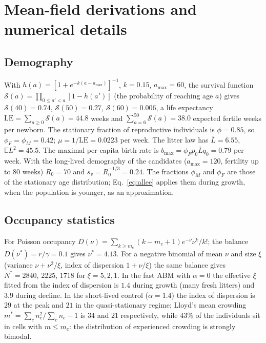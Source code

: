 
\section{Mean-field derivations and numerical details}
\label{app:meanfield}

\subsection{Demography}
\label{app:demo}

With $h(a)=[1+e^{-k(a-a_{\max})}]^{-1}$, $k=0.15$, $a_{\max}=60$, the survival
function $\mathcal S(a)=\prod_{0\le a'<a}[1-h(a')]$ (the probability of reaching age $a$) gives
$\mathcal S(40)=0.74$, $\mathcal S(50)=0.27$, $\mathcal S(60)=0.006$, a life expectancy
$\mathrm{LE}=\sum_{a\ge0}\mathcal S(a)=44.8$ weeks and
$\sum_{a=6}^{50}\mathcal S(a)=38.0$ expected fertile weeks per newborn. The
stationary fraction of reproductive individuals is $\phi=0.85$, so
$\phi_F=\phi_M=0.42$; $\mu=1/\mathrm{LE}=0.0223$ per week. The litter law has
$\bar L=6.55$, $\mathbb E L^2=45.5$. The maximal per-capita birth rate is
$b_{\max}=\phi_F p_0\bar L q_0=0.79$ per week. With the long-lived demography of the candidates ($a_{\max}=120$,
fertility up to 80 weeks) $R_0=70$ and $s_v=R_0^{-1/3}=0.24$. The fractions $\phi_M$ and $\phi_F$ are those of the
stationary age distribution; Eq.~\eqref{eq:allee} applies them during growth, when the population is younger, as an
approximation.

\subsection{Occupancy statistics}
\label{app:occ}

For Poisson occupancy $D(\nu)=\sum_{k\ge m_c}(k-m_c+1)e^{-\nu}\nu^k/k!$;
the balance $D(\nu^*)=r/\gamma=0.1$ gives $\nu^*=4.13$. For a negative
binomial of mean $\nu$ and size $\xi$ (variance $\nu+\nu^2/\xi$,
index of dispersion $1+\nu/\xi$) the same balance gives
$N^*=2840,\,2225,\,1718$ for $\xi=5,2,1$. In the fast ABM with $\alpha=0$
the effective $\xi$ fitted from the index of dispersion is $1.4$ during
growth (many fresh litters) and $3.9$ during decline. In the short-lived control
($\alpha=1.4$) the index of dispersion is $29$ at the peak and $21$ in the
quasi-stationary regime; Lloyd's mean crowding $m^*=\sum_c n_c^2/\sum_c n_c-1$
is $34$ and $21$ respectively, while $43\%$ of the individuals sit in cells with
$m\le m_c$: the distribution of experienced crowding is strongly bimodal.

